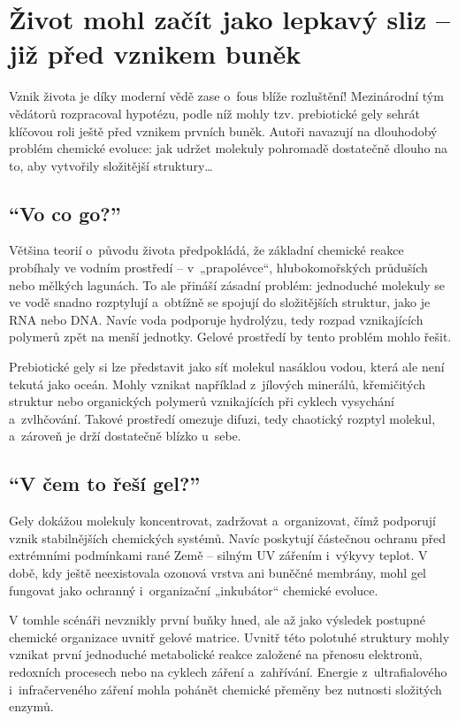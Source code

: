 \documentclass[main.tex]{subfiles}
\begin{document}
\section{Život mohl začít jako lepkavý sliz – již před vznikem buněk}
Vznik života je díky moderní vědě zase o~fous blíže rozluštění! Mezinárodní tým vědátorů rozpracoval hypotézu, podle níž mohly tzv. prebiotické gely sehrát klíčovou roli ještě před vznikem prvních buněk. Autoři navazují na dlouhodobý problém chemické evoluce: jak udržet molekuly pohromadě dostatečně dlouho na to, aby vytvořily složitější struktury…
\subsection*{\enquote{Vo co go?}}
Většina teorií o~původu života předpokládá, že základní chemické reakce probíhaly ve vodním prostředí – v~„prapolévce“, hlubokomořských průduších nebo mělkých lagunách. To ale přináší zásadní problém: jednoduché molekuly se ve vodě snadno rozptylují a~obtížně se spojují do složitějších struktur, jako je RNA nebo DNA. Navíc voda podporuje hydrolýzu, tedy rozpad vznikajících polymerů zpět na menší jednotky. Gelové prostředí by tento problém mohlo řešit.\par
Prebiotické gely si lze představit jako síť molekul nasáklou vodou, která ale není tekutá jako oceán. Mohly vznikat například z~jílových minerálů, křemičitých struktur nebo organických polymerů vznikajících při cyklech vysychání a~zvlhčování. Takové prostředí omezuje difuzi, tedy chaotický rozptyl molekul, a~zároveň je drží dostatečně blízko u~sebe.
\subsection*{\enquote{V čem to řeší gel?}}
Gely dokážou molekuly koncentrovat, zadržovat a~organizovat, čímž podporují vznik stabilnějších chemických systémů. Navíc poskytují částečnou ochranu před extrémními podmínkami rané Země – silným UV zářením i~výkyvy teplot. V době, kdy ještě neexistovala ozonová vrstva ani buněčné membrány, mohl gel fungovat jako ochranný i~organizační „inkubátor“ chemické evoluce.\par
V tomhle scénáři nevznikly první buňky hned, ale až jako výsledek postupné chemické organizace uvnitř gelové matrice. Uvnitř této polotuhé struktury mohly vznikat první jednoduché metabolické reakce založené na přenosu elektronů, redoxních procesech nebo na cyklech záření a~zahřívání. Energie z~ultrafialového i~infračerveného záření mohla pohánět chemické přeměny bez nutnosti složitých enzymů.
\end{document}
